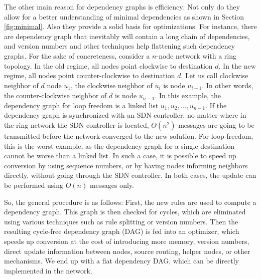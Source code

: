 The other main reason for dependency graphs is efficiency: Not only do they allow for a better understanding of minimal dependencies as shown in Section \ref{fig:minimal}. Also they provide a solid basis for optimizations. For instance, there are dependency graph that inevitably will contain a long chain of dependencies, and version numbers and other techniques help flattening such dependency graphs. For the sake of concreteness, consider a $n$-node network with a ring topology. In the old regime, all nodes point clockwise to destination $d$. In the new regime, all nodes point counter-clockwise to destination $d$. Let us call clockwise neighbor of $d$ node $u_1$, the clockwise neighbor of $u_i$ is node $u_{i+1}$. In other words, the counter-clockwise neighbor of $d$ is node $u_{n-1}$. In this example, the dependency graph for loop freedom is a linked list $u_1,u_2,\ldots,u_{n-1}$. If the dependency graph is synchronized with an SDN controller, no matter where in the ring network the SDN controller is located, $\Theta(n^2)$ messages are going to be transmitted before the network converged to the new solution. For loop freedom, this is the worst example, as the dependency graph for a single destination cannot be worse than a linked list. In such a case, it is possible to speed up conversion by using sequence numbers, or by having nodes informing neighbors directly, without going through the SDN controller. In both cases, the update can be performed using $O(n)$ messages only.

So, the general procedure is as follows: First, the new rules are used to compute a dependency graph. This graph is then checked for cycles, which are eliminated using various techniques such as rule splitting or version numbers. Then the resulting cycle-free dependency graph (DAG) is fed into an optimizer, which speeds up conversion at the cost of introducing more memory, version numbers, direct update information between nodes, source routing, helper nodes, or other mechanisms. We end up with a flat dependency DAG, which can be directly implemented in the network.


